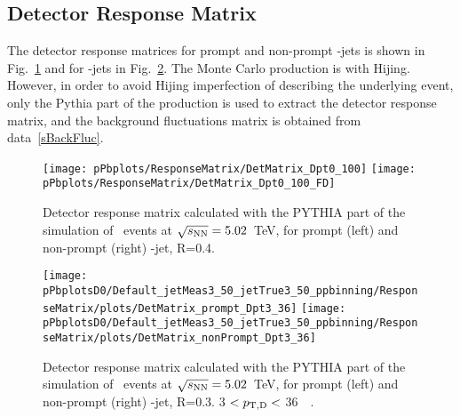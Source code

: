 \subsection{Detector Response Matrix}
\label{Det_Resp}

The detector response matrices for prompt and non-prompt \Dstar-jets is shown in Fig.~\ref{fig:fRMdet_pPb} and for \Dzero-jets in Fig.~\ref{fig:fRMdet_pPb_Dzero}.
The Monte Carlo production is with Hijing. However, in order to avoid Hijing imperfection of describing the underlying event, 
only the Pythia part of the production is used to extract the detector response matrix, and the background fluctuations matrix is obtained from data~\ref{sBackFluc}.

\begin{figure}[bth]
\centering
\texttt{[image: pPbplots/ResponseMatrix/DetMatrix\_Dpt0\_100]}
\texttt{[image: pPbplots/ResponseMatrix/DetMatrix\_Dpt0\_100\_FD]}
\caption{Detector response matrix calculated with the PYTHIA part of the simulation of \pPb\ events at $\sqrt{s_{\rm NN}}=5.02$~TeV, for prompt (left) and non-prompt (right) \Dstar-jet, R=0.4.}
\label{fig:fRMdet_pPb}
\end{figure}


\begin{figure}[bth]
\centering
\texttt{[image: pPbplotsD0/Default\_jetMeas3\_50\_jetTrue3\_50\_ppbinning/ResponseMatrix/plots/DetMatrix\_prompt\_Dpt3\_36]}
\texttt{[image: pPbplotsD0/Default\_jetMeas3\_50\_jetTrue3\_50\_ppbinning/ResponseMatrix/plots/DetMatrix\_nonPrompt\_Dpt3\_36]}
\caption{Detector response matrix calculated with the PYTHIA part of the simulation of \pPb\ events at $\sqrt{s_{\rm NN}}=5.02$~TeV, for prompt (left) and non-prompt (right) \Dzero-jet, R=0.3. 3 $< p_{\mathrm{T,D}} < $ 36~\GeVc\ .}
\label{fig:fRMdet_pPb_Dzero}
\end{figure}

